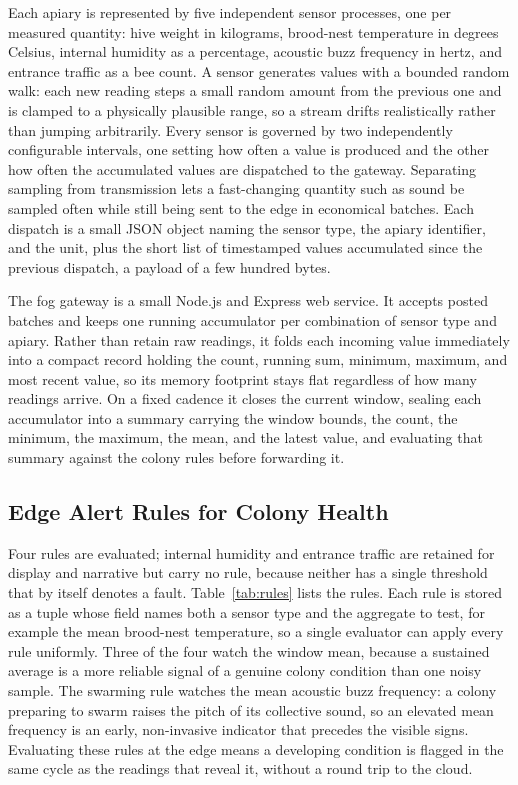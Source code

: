 \documentclass[conference]{IEEEtran}
\begin{document}
Each apiary is represented by five independent sensor processes, one per measured quantity: hive weight in kilograms, brood-nest temperature in degrees Celsius, internal humidity as a percentage, acoustic buzz frequency in hertz, and entrance traffic as a bee count. A sensor generates values with a bounded random walk: each new reading steps a small random amount from the previous one and is clamped to a physically plausible range, so a stream drifts realistically rather than jumping arbitrarily. Every sensor is governed by two independently configurable intervals, one setting how often a value is produced and the other how often the accumulated values are dispatched to the gateway. Separating sampling from transmission lets a fast-changing quantity such as sound be sampled often while still being sent to the edge in economical batches. Each dispatch is a small JSON object naming the sensor type, the apiary identifier, and the unit, plus the short list of timestamped values accumulated since the previous dispatch, a payload of a few hundred bytes.

The fog gateway is a small Node.js and Express web service. It accepts posted batches and keeps one running accumulator per combination of sensor type and apiary. Rather than retain raw readings, it folds each incoming value immediately into a compact record holding the count, running sum, minimum, maximum, and most recent value, so its memory footprint stays flat regardless of how many readings arrive. On a fixed cadence it closes the current window, sealing each accumulator into a summary carrying the window bounds, the count, the minimum, the maximum, the mean, and the latest value, and evaluating that summary against the colony rules before forwarding it.

\subsection{Edge Alert Rules for Colony Health}

Four rules are evaluated; internal humidity and entrance traffic are retained for display and narrative but carry no rule, because neither has a single threshold that by itself denotes a fault. Table~\ref{tab:rules} lists the rules. Each rule is stored as a tuple whose field names both a sensor type and the aggregate to test, for example the mean brood-nest temperature, so a single evaluator can apply every rule uniformly. Three of the four watch the window mean, because a sustained average is a more reliable signal of a genuine colony condition than one noisy sample. The swarming rule watches the mean acoustic buzz frequency: a colony preparing to swarm raises the pitch of its collective sound, so an elevated mean frequency is an early, non-invasive indicator that precedes the visible signs. Evaluating these rules at the edge means a developing condition is flagged in the same cycle as the readings that reveal it, without a round trip to the cloud.
\end{document}
